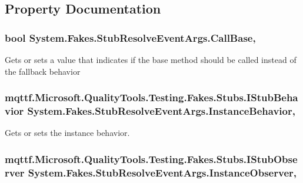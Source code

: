 \subsection{Property Documentation}
\hypertarget{class_system_1_1_fakes_1_1_stub_resolve_event_args_a433ef6c759542d7cdc2e8b9765271034}{
\subsubsection[{Call\-Base}]{\setlength{\rightskip}{0pt plus 5cm}bool System.\-Fakes.\-Stub\-Resolve\-Event\-Args.\-Call\-Base\hspace{0.3cm}{\ttfamily [get]}, {\ttfamily [set]}}}\label{class_system_1_1_fakes_1_1_stub_resolve_event_args_a433ef6c759542d7cdc2e8b9765271034}


Gets or sets a value that indicates if the base method should be called instead of the fallback behavior

\hypertarget{class_system_1_1_fakes_1_1_stub_resolve_event_args_ac146abc9181b0d7ed46c2e2855678041}{
\subsubsection[{Instance\-Behavior}]{\setlength{\rightskip}{0pt plus 5cm}mqttf.\-Microsoft.\-Quality\-Tools.\-Testing.\-Fakes.\-Stubs.\-I\-Stub\-Behavior System.\-Fakes.\-Stub\-Resolve\-Event\-Args.\-Instance\-Behavior\hspace{0.3cm}{\ttfamily [get]}, {\ttfamily [set]}}}\label{class_system_1_1_fakes_1_1_stub_resolve_event_args_ac146abc9181b0d7ed46c2e2855678041}


Gets or sets the instance behavior.

\hypertarget{class_system_1_1_fakes_1_1_stub_resolve_event_args_aa75cf83e4ef2eec85f7d36e684c12f3b}{
\subsubsection[{Instance\-Observer}]{\setlength{\rightskip}{0pt plus 5cm}mqttf.\-Microsoft.\-Quality\-Tools.\-Testing.\-Fakes.\-Stubs.\-I\-Stub\-Observer System.\-Fakes.\-Stub\-Resolve\-Event\-Args.\-Instance\-Observer\hspace{0.3cm}{\ttfamily [get]}, {\ttfamily [set]}}}\label{class_system_1_1_fakes_1_1_stub_resolve_event_args_aa75cf83e4ef2eec85f7d36e684c12f3b}


